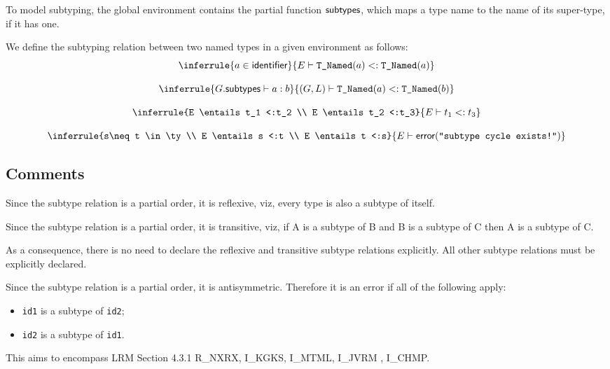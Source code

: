 \documentclass{book}
\newcommand\RuleComment[1]{// \textit{#1}}
\newcommand\subtype[0]{<:}
\begin{document}
To model subtyping, the global environment contains the partial function $\textsf{subtypes}$, which maps a type name to the name of its super-type, if it has one.

We define the subtyping relation between two named types in a given environment as follows:
\[
\begin{array}{c}
\inferrule{a \in \identifier}{E \entails \TNamed(a) \subtype \TNamed(a)} \\
\\
\inferrule{G.\subtypes \entails a : b }
{(G,L) \entails \TNamed(a) \subtype \TNamed(b)}\\
\\
\inferrule{E \entails t_1 \subtype t_2 \\ E \entails t_2 \subtype t_3}{E \entails t_1 \subtype t_3}\\
\\
\todocomment{
\RuleComment{ROMAN: consider adding the following rule.}
\\
}
\inferrule{s\neq t \in \ty \\ E \entails s \subtype t \\ E \entails t \subtype s}{E \entails \error(\texttt{"subtype cycle exists!"})}
\end{array}
\]
	  
  \subsection{Comments}
  Since the subtype relation is a partial order, it is reflexive, viz, 
  every type is also a subtype of itself. 

  Since the subtype relation is a partial order, it is transitive, viz, if A is
  a subtype of B and B is a subtype of C then A is a subtype of C.
 
  As a consequence, there is no need to declare the reflexive and transitive
  subtype relations explicitly. All other subtype relations must be explicitly
  declared.
 
  Since the subtype relation is a partial order, it is antisymmetric. Therefore
  it is an error if all of the following apply:
  \begin{itemize}
  \item \texttt{id1} is a subtype of \texttt{id2};
  \item \texttt{id2} is a subtype of \texttt{id1}.
  \end{itemize}

  This aims to encompass LRM Section 4.3.1 R\_NXRX, I\_KGKS, I\_MTML, I\_JVRM 
, I\_CHMP.
\end{document}
